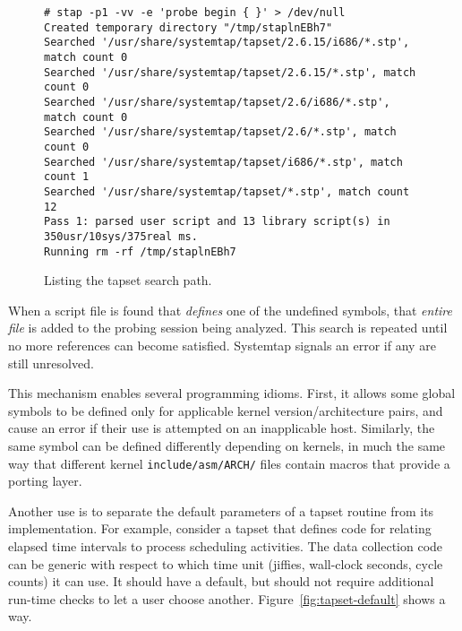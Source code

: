 \documentclass{article}
\newenvironment{boxedminipage}%
    {\begin{makeimage}\begin{center}\begin{Sbox}\begin{minipage}}%
    {\end{minipage}\end{Sbox}\fbox{\TheSbox}\end{center}\end{makeimage}}
\begin{document}
\begin{figure}[!ht]
\begin{boxedminipage}{6in}
\begin{verbatim}
# stap -p1 -vv -e 'probe begin { }' > /dev/null
Created temporary directory "/tmp/staplnEBh7"
Searched '/usr/share/systemtap/tapset/2.6.15/i686/*.stp', match count 0
Searched '/usr/share/systemtap/tapset/2.6.15/*.stp', match count 0
Searched '/usr/share/systemtap/tapset/2.6/i686/*.stp', match count 0
Searched '/usr/share/systemtap/tapset/2.6/*.stp', match count 0
Searched '/usr/share/systemtap/tapset/i686/*.stp', match count 1
Searched '/usr/share/systemtap/tapset/*.stp', match count 12
Pass 1: parsed user script and 13 library script(s) in 350usr/10sys/375real ms.
Running rm -rf /tmp/staplnEBh7
\end{verbatim}
\end{boxedminipage}
\caption{Listing the tapset search path.}
\label{fig:tapset-search}
\end{figure}

When a script file is found that {\em defines} one of the undefined
symbols, that {\em entire file} is added to the probing session being
analyzed.  This search is repeated until no more references can become
satisfied.  Systemtap signals an error if any are still unresolved.

This mechanism enables several programming idioms.  First, it allows
some global symbols to be defined only for applicable kernel
version/architecture pairs, and cause an error if their use is
attempted on an inapplicable host.  Similarly, the same symbol can be
defined differently depending on kernels, in much the same way that
different kernel \verb+include/asm/ARCH/+ files contain macros that
provide a porting layer.

Another use is to separate the default parameters of a tapset routine
from its implementation.  For example, consider a tapset that defines
code for relating elapsed time intervals to process scheduling
activities.  The data collection code can be generic with respect to
which time unit (jiffies, wall-clock seconds, cycle counts) it can
use.  It should have a default, but should not require additional
run-time checks to let a user choose another.
Figure~\ref{fig:tapset-default} shows a way.
\end{document}
